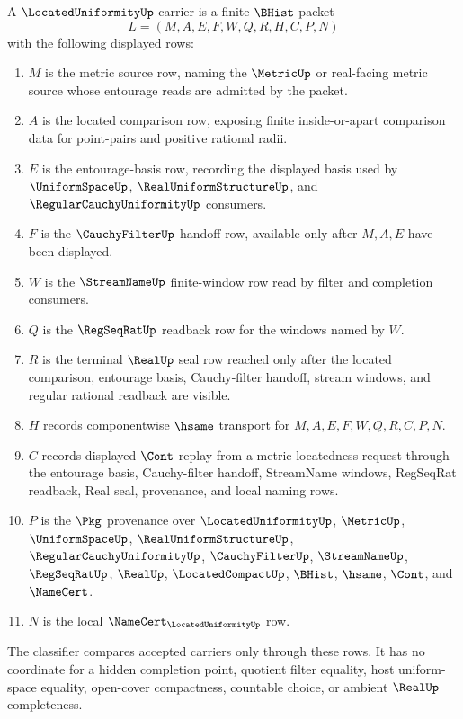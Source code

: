 \begin{definition}
\label{def:located-uniformity-carrier}
A $\LocatedUniformityUp$ carrier is a finite $\BHist$ packet
$$
L=(M,A,E,F,W,Q,R,H,C,P,N)
$$
with the following displayed rows:
\begin{enumerate}
\item $M$ is the metric source row, naming the $\MetricUp$ or real-facing metric
source whose entourage reads are admitted by the packet.
\item $A$ is the located comparison row, exposing finite inside-or-apart
comparison data for point-pairs and positive rational radii.
\item $E$ is the entourage-basis row, recording the displayed basis used by
$\UniformSpaceUp$, $\RealUniformStructureUp$, and $\RegularCauchyUniformityUp$
consumers.
\item $F$ is the $\CauchyFilterUp$ handoff row, available only after $M,A,E$
have been displayed.
\item $W$ is the $\StreamNameUp$ finite-window row read by filter and completion
consumers.
\item $Q$ is the $\RegSeqRatUp$ readback row for the windows named by $W$.
\item $R$ is the terminal $\RealUp$ seal row reached only after the located
comparison, entourage basis, Cauchy-filter handoff, stream windows, and regular
rational readback are visible.
\item $H$ records componentwise $\hsame$ transport for
$M,A,E,F,W,Q,R,C,P,N$.
\item $C$ records displayed $\Cont$ replay from a metric locatedness request
through the entourage basis, Cauchy-filter handoff, StreamName windows,
RegSeqRat readback, Real seal, provenance, and local naming rows.
\item $P$ is the $\Pkg$ provenance over $\LocatedUniformityUp$, $\MetricUp$,
$\UniformSpaceUp$, $\RealUniformStructureUp$, $\RegularCauchyUniformityUp$,
$\CauchyFilterUp$, $\StreamNameUp$, $\RegSeqRatUp$, $\RealUp$,
$\LocatedCompactUp$, $\BHist$, $\hsame$, $\Cont$, and $\NameCert$.
\item $N$ is the local $\NameCert_{\LocatedUniformityUp}$ row.
\end{enumerate}
The classifier compares accepted carriers only through these rows. It has no
coordinate for a hidden completion point, quotient filter equality, host
uniform-space equality, open-cover compactness, countable choice, or ambient
$\RealUp$ completeness.
\end{definition}


